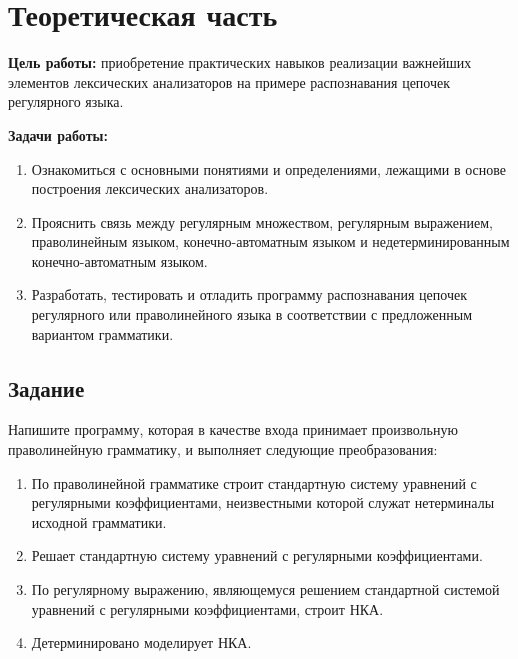 \chapter{Теоретическая часть}

\textbf{Цель работы:} приобретение практических навыков реализации важнейших элементов лексических анализаторов на примере распознавания цепочек регулярного языка.

\textbf{Задачи работы:}

\begin{enumerate}
	\item Ознакомиться с основными понятиями и определениями, лежащими в основе построения лексических анализаторов.
	\item Прояснить связь между регулярным множеством, регулярным выражением, праволинейным языком, конечно-автоматным языком и недетерминированным конечно-автоматным языком.
	\item Разработать, тестировать и отладить программу распознавания цепочек регулярного или праволинейного языка в соответствии с предложенным вариантом грамматики.
\end{enumerate}

\section{Задание}

Напишите программу, которая в качестве входа принимает произвольную праволинейную грамматику, и выполняет следующие преобразования:

\begin{enumerate}
	\item По праволинейной грамматике строит стандартную систему уравнений с регулярными коэффициентами, неизвестными которой служат нетерминалы исходной грамматики.
	\item Решает стандартную систему уравнений с регулярными коэффициентами.
	\item По регулярному выражению, являющемуся решением стандартной системой уравнений с регулярными коэффициентами, строит НКА.
	\item Детерминировано моделирует НКА.
\end{enumerate}

%



   
